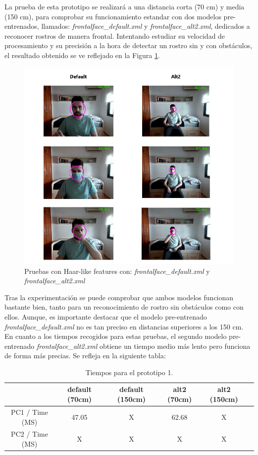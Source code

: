 La prueba de esta prototipo se realizará a una distancia corta (70 cm)  y media (150 cm), para comprobar su funcionamiento estandar con dos modelos pre-entrenados, llamados:  \textit{frontalface\_default.xml} y \textit{frontalface\_alt2.xml}, dedicados a reconocer rostros de manera frontal. Intentando estudiar su velocidad de procesamiento y su precisión a la hora de detectar un rostro sin y con obstáculos, el resultado obtenido se ve reflejado en la Figura \ref{fig:haar1}.

\begin{figure}[htp]
	\centering
	\includegraphics[width=15cm]{imagenes/prueba_proto1.jpg}
	\caption{Pruebas con Haar-like features con: \textit{frontalface\_default.xml} y \textit{frontalface\_alt2.xml}}
	\label{fig:haar1}
\end{figure}

Tras la experimentación se puede comprobar que ambos modelos funcionan bastante bien, tanto para un reconocimiento de rostro sin obstáculos como con ellos. Aunque, es importante destacar que el modelo pre-entrenado \textit{frontalface\_default.xml} no es tan preciso en distancias superiores a los 150 cm. En cuanto a los tiempos recogidos para estas pruebas, el segundo modelo pre-entrenado \textit{frontalface\_alt2.xml} obtiene un tiempo medio más lento pero funciona de forma más precias. Se refleja en la siguiente tabla:

\begin{table}[h!]
	\begin{center}
		\begin{tabular}{ |c|c|c|c|c|c| } 
			\hline
			& default (70cm) & default (150cm) & alt2 (70cm) & alt2 (150cm) \\
			\hline
			PC1 / Time (MS) & 47.05  & X & 62.68  & X \\
			\hline
			PC2 / Time (MS) & X  & X & X  & X \\
			\hline
		\end{tabular}
		\caption{Tiempos para el prototipo 1.}
		\label{tab:table2}
	\end{center}
\end{table}

